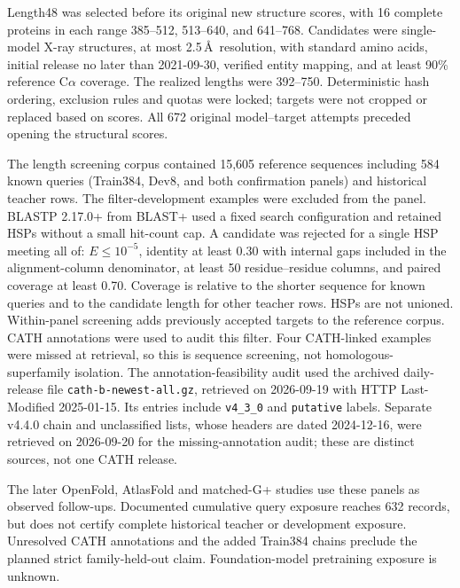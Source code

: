 Length48 was selected before its original new structure scores, with 16
complete proteins in each range 385--512, 513--640, and 641--768. Candidates
were single-model X-ray structures, at most 2.5\,\AA\ resolution, with standard
amino acids, initial release no later than 2021-09-30, verified entity mapping,
and at least 90\% reference C$\alpha$ coverage. The realized lengths
were 392--750. Deterministic hash ordering, exclusion rules and quotas were
locked; targets were not cropped or replaced based on scores. All 672 original
model--target attempts preceded opening the structural scores.

The length screening corpus contained 15,605 reference sequences including
584 known queries (Train384, Dev8, and both confirmation panels) and historical
teacher rows. The filter-development examples were excluded from the panel.
BLASTP 2.17.0+ from BLAST+ \citep{camacho2009blastplus} used a fixed search configuration and retained HSPs without a
small hit-count cap. A candidate was rejected for a single HSP meeting all of:
$E\le10^{-5}$, identity at least 0.30 with internal gaps included in the
alignment-column denominator, at least 50 residue--residue columns, and paired
coverage at least 0.70. Coverage is relative to the shorter sequence for known
queries and to the candidate length for other teacher rows. HSPs are not
unioned. Within-panel screening adds previously accepted targets to the
reference corpus. CATH annotations \citep{orengo1997cath} were used to audit
this filter. Four CATH-linked examples were missed at retrieval, so this
is sequence screening, not homologous-superfamily isolation.
The annotation-feasibility audit used the archived daily-release file
\texttt{cath-b-newest-all.gz}, retrieved on 2026-09-19 with HTTP
Last-Modified 2025-01-15. Its entries include \texttt{v4\_3\_0} and
\texttt{putative} labels. Separate v4.4.0 chain and unclassified lists,
whose headers are dated 2024-12-16, were retrieved on 2026-09-20 for the
missing-annotation audit; these are distinct sources, not one CATH release.

The later OpenFold, AtlasFold and matched-G+ studies use these panels as
observed follow-ups. Documented cumulative query exposure reaches 632 records,
but does not certify complete historical teacher or development exposure.
Unresolved CATH annotations and the added Train384 chains preclude the planned
strict family-held-out claim. Foundation-model pretraining exposure is unknown.

